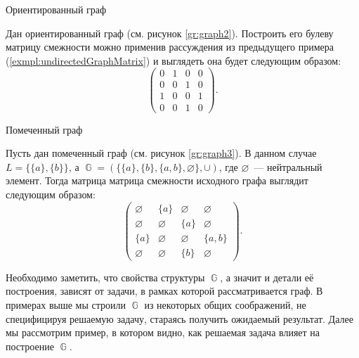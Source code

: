 \begin{marginfigure}
    \caption{Ориентированный граф}
    \label{gr:graph2}
    \begin{center}
        
    \end{center}
\end{marginfigure}
\begin{example}
    \label{example:diGraph}
    Дан ориентированный граф (см. рисунок \ref{gr:graph2}).
    Построить его булеву матрицу смежности можно применив рассуждения из предыдущего примера (\ref{exmpl:undirectedGraphMatrix}) и выглядеть она будет следующим образом:
    \[
        \begin{pmatrix}
            0 & 1 & 0 & 0 \\
            0 & 0 & 1 & 0 \\
            1 & 0 & 0 & 1 \\
            0 & 0 & 1 & 0
        \end{pmatrix}.
    \]
\end{example}

\begin{marginfigure}
    \caption{Помеченный граф}
    \label{gr:graph3}
    \begin{center}
        
    \end{center}
\end{marginfigure}
\begin{example}
    Пусть дан помеченный граф (см. рисунок \ref{gr:graph3}).
    В данном случае $L = \{\{a\},\{b\}\}$, а $\BbbG = ( \{\{a\},\{b\},\{a,b\},\varnothing\} ,\cup)$, где $\varnothing$~--- нейтральный элемент.
    Тогда матрица матрица смежности исходного графа выглядит следующим образом:
    \[
        \begin{pmatrix}
            \varnothing & \{a\}       & \varnothing & \varnothing \\
            \varnothing & \varnothing & \{a\}       & \varnothing \\
            \{a\}       & \varnothing & \varnothing & \{a,b\}     \\
            \varnothing & \varnothing & \{b\}       & \varnothing
        \end{pmatrix}.
    \]
\end{example}

Необходимо заметить, что свойства структуры $\BbbG$, а значит и детали её построения, зависят от задачи, в рамках которой рассматривается граф.
В примерах выше мы строили $\BbbG$ из некоторых общих соображений, не специфицируя решаемую задачу, стараясь получить ожидаемый результат.
Далее мы рассмотрим пример, в котором видно, как решаемая задача влияет на построение $\BbbG$.

